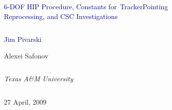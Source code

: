 \documentclass[compress]{beamer}
\begin{document}
\begin{frame}
\vfill
\begin{center}
\textcolor{darkblue}{\Large \mbox{\hspace{-0.5 cm}6-DOF} HIP Procedure, Constants \mbox{for TrackerPointing\hspace{-0.5 cm}} \\ \vspace{0.2 cm} Reprocessing, and CSC Investigations}

\vfill
\begin{columns}
\begin{center}
\large
\textcolor{darkblue}{Jim Pivarski}

\vspace{0.2 cm}
Alexei Safonov
\end{center}
\end{columns}

\begin{columns}
\begin{center}
\scriptsize
{\it Texas A\&M University}
\end{center}
\end{columns}

\vfill
27 April, 2009

\end{center}
\end{frame}


\small
\end{document}
